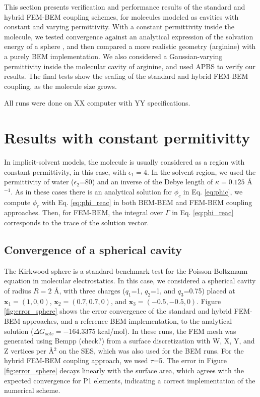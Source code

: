 This section presents verification and performance results of the standard and hybrid FEM-BEM coupling schemes, for molecules modeled as cavities with constant and varying permittivity.
With a constant permittivity inside the molecule, we tested convergence against an analytical expression of the solvation energy of a sphere \cite{Kirkwood1934}, and then compared a more realistic geometry (arginine) with a purely BEM implementation.
We also considered a Gaussian-varying permittivity\cite{grant2001smooth,li2013dielectric} inside the molecular cavity of arginine, and used APBS \cite{BakerETal2001} to verify our results.
The final tests show the scaling of the standard and hybrid FEM-BEM coupling, as the molecule size grows. 

All runs were done on XX computer with YY specifications. 

\section*{\sffamily \Large Results with constant permitivitty}

In implicit-solvent models, the molecule is usually considered as a region with constant permittivity, in this case, with $\epsilon_1=4$.
In the solvent region, we used the permittivity of water ($\epsilon_2$=80) and an inverse of the Debye length of $\kappa=0.125$ \AA$^{-1}$.
As in these cases there is an analytical solution for $\phi_c$ in Eq. \eqref{eq:phic}, we compute $\phi_r$ with Eq. \eqref{eq:phi_reac} in both BEM-BEM and FEM-BEM coupling approaches. Then, for FEM-BEM, the integral over $\Gamma$ in Eq. \eqref{eq:phi_reac} corresponds to the trace of the solution vector.

\subsection*{\sffamily \large Convergence of a spherical cavity}

The Kirkwood sphere \cite{Kirkwood1934} is a standard benchmark test for the Poisson-Boltzmann equation in molecular electrostatics. 
In this case, we considered a spherical cavity of radius $R=2$ \AA, with three charges ($q_1$=1, $q_2$=1, and $q_3$=0.75) placed at $\mathbf{x}_1=(1,0,0)$, $\mathbf{x}_2=(0.7,0.7,0)$, and $\mathbf{x}_3=(-0.5,-0.5,0)$.
Figure \ref{fig:error_sphere} shows the error convergence of the standard and hybrid FEM-BEM approaches, and a reference BEM implementation, to the analytical solution ($\Delta G_{solv}= -164.3375$ kcal/mol). 
In these runs, the FEM mesh was generated using Bempp (check?) from a surface discretization with W, X, Y, and Z vertices per \AA$^2$ on the SES, which was also used for the BEM runs. 
For the hybrid FEM-BEM coupling approach, we used $\tau$=5.
The error in Figure \ref{fig:error_sphere} decays linearly with the surface area, which agrees with the expected convergence for P1 elements, indicating a correct implementation of the numerical scheme. 

